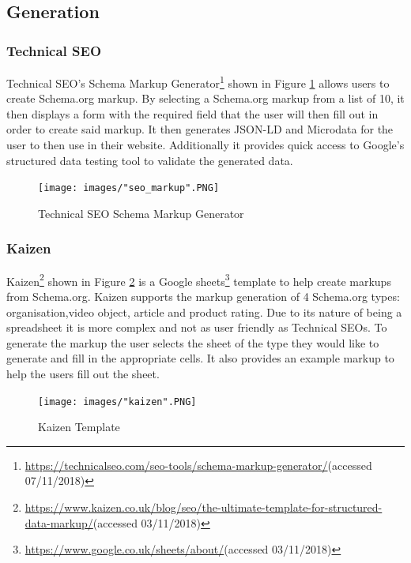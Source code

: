 \subsection{Generation}
\subsubsection*{Technical SEO}
Technical SEO's Schema Markup Generator\footnote{\url{https://technicalseo.com/seo-tools/schema-markup-generator/}(accessed 07/11/2018)} shown in Figure \ref{fig:technicalSEO} allows users to create Schema.org markup. By selecting a Schema.org markup from a list of 10, it then displays a form with the required field that the user will then fill out in order to create said markup. It then generates JSON-LD and Microdata for the user to then use in their website. Additionally it provides quick access to Google's structured data testing tool to validate the generated data. \newline

\begin{figure}[h!]
 \centering\texttt{[image: images/"seo\_markup".PNG]}
   \caption{Technical SEO Schema Markup Generator}
    \label{fig:technicalSEO}
\end{figure}

\newpage
\subsubsection*{Kaizen}\label{sec:kaizen}
Kaizen\footnote{\url{https://www.kaizen.co.uk/blog/seo/the-ultimate-template-for-structured-data-markup/}(accessed 03/11/2018)} shown in Figure \ref{fig:kaizen} is a Google sheets\footnote{\url{https://www.google.co.uk/sheets/about/}(accessed 03/11/2018)} template to help create markups from Schema.org. Kaizen supports the markup generation of 4 Schema.org types: organisation,video object, article and product rating. Due to its nature of being a spreadsheet it is more complex and not as user friendly as Technical SEOs. To generate the markup the user selects the sheet of the type they would like to generate and fill in the appropriate cells. It also provides an example markup to help the users fill out the sheet.\newline

\begin{figure}[h!]
 \centering\texttt{[image: images/"kaizen".PNG]}
   \caption{Kaizen Template}
   \label{fig:kaizen}
\end{figure}

